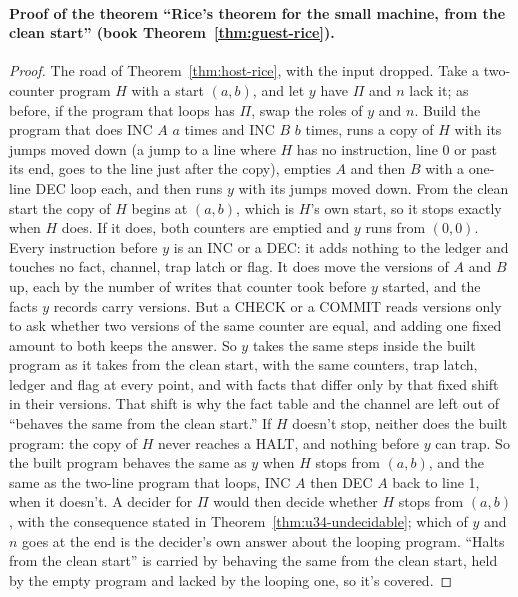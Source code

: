 \documentclass[11pt,twoside]{article}
\theoremstyle{thielethm}
\theoremstyle{thieledef}
\theoremstyle{thieledef}
\theoremstyle{thieledef}
\theoremstyle{thielethm}
\theoremstyle{thieleobs}
\theoremstyle{thielethm}
\begin{document}
\paragraph{Proof of the theorem ``Rice's theorem for the small machine, from the clean start'' (book Theorem~\ref{thm:guest-rice}).}
\begin{proof}
The road of Theorem~\ref{thm:host-rice}, with the input dropped. Take a two-counter program $H$ with
a start $(a, b)$, and let $y$ have $\Pi$ and $n$ lack it; as before, if the program that loops has
$\Pi$, swap the roles of $y$ and $n$. Build the program that does INC $A$ $a$ times and INC $B$ $b$
times, runs a copy of $H$ with its jumps moved down (a jump to a line where $H$ has no instruction, line 0 or past its end, goes to the line
just after the copy), empties $A$ and then $B$ with a one-line DEC loop
each, and then runs $y$ with its jumps moved down. From the clean start the copy of $H$ begins at
$(a, b)$, which is $H$'s own start, so it stops exactly when $H$ does. If it does, both counters are
emptied and $y$ runs from $(0, 0)$. Every instruction before $y$ is an INC or a DEC: it adds
nothing to the ledger and touches no fact, channel, trap latch or flag. It does move the versions of $A$ and $B$ up, each by
the number of writes that counter took before $y$ started, and the facts $y$ records carry versions.
But a CHECK or a COMMIT reads versions only to ask whether two versions of the same counter are
equal, and adding one fixed amount to both keeps the answer. So $y$ takes the same steps inside the
built program as it takes from the clean start, with the same counters, trap latch, ledger and flag
at every point, and with facts that differ only by that fixed shift in their versions. That shift is
why the fact table and the channel are left out of ``behaves the same from the clean start.'' If $H$ doesn't stop,
neither does the built program: the copy of $H$ never reaches a HALT, and nothing before $y$ can
trap. So the built program behaves the same as $y$ when $H$ stops from $(a, b)$, and the same as the
two-line program that loops, INC $A$ then DEC $A$ back to line 1, when it doesn't. A decider for
$\Pi$ would then decide whether $H$ stops from $(a, b)$, with the consequence stated in
Theorem~\ref{thm:u34-undecidable}; which of $y$ and $n$ goes at the end is the decider's own
answer about the looping program. ``Halts
from the clean start'' is carried by behaving the same from the clean start, held by the empty
program and lacked by the looping one, so it's covered.
\end{proof}
\end{document}
